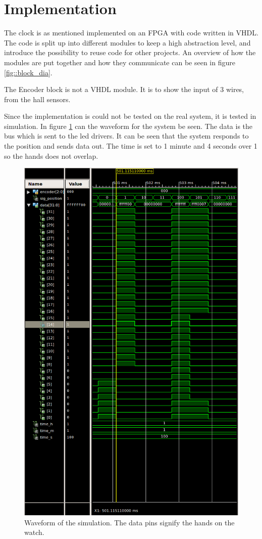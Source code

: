 \section{Implementation}
The clock is as mentioned implemented on an FPGA with code written in VHDL.
The code is split up into different modules to keep a high abstraction level, and introduce the possibility to reuse code for other projects.
An overview of how the modules are put together and how they communicate can be seen in figure \ref{fig::block_dia}.


The Encoder block is not a VHDL module.
It is to show the input of 3 wires, from the hall sensors.

Since the implementation is could not be tested on the real system, it is tested in simulation.
In figure \ref{fig:simulation_wave} can the waveform for the system be seen.
The data is the bus which is sent to the led drivers.
It can be seen that the system responds to the position and sends data out.
The time is set to 1 minute and 4 seconds over 1 so the hands does not overlap.

\begin{figure}
 \centering
 \includegraphics[scale=0.7]{img/waveform}
 \caption[Waveform of the simulation.]{Waveform of the simulation. The data pins signify the hands on the watch.}
 \label{fig:simulation_wave}
\end{figure}
